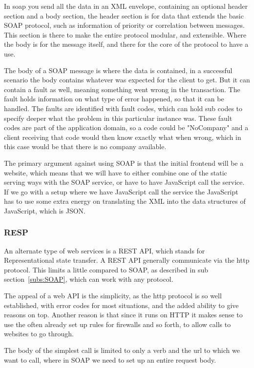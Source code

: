 In soap you send all the data in an XML envelope, containing an optional header section and a body section, the header section is for data that extends the basic SOAP protocol, such as information of priority or correlation between messages\cite{soap:messaging}. This section is there to make the entire protocol modular, and extensible. Where the body is for the message itself, and there for the core of the protocol to have a use.

The body of a SOAP message is where the data is contained, in a successful scenario the body contains whatever was expected for the client to get. But it can contain a fault as well, meaning something went wrong in the transaction. The fault holds information on what type of error happened, so that it can be handled. The faults are identified with fault codes, which can hold sub codes to specify deeper what the problem in this particular instance was. These fault codes are part of the application domain, so a code could be "NoCompany" and a client receiving that code would then know exactly what when wrong, which in this case would be that there is no company available.

The primary argument against using SOAP is that the initial frontend will be a website, which means that we will have to either combine one of the static serving ways with the SOAP service, or have to have JavaScript call the service. If we go with a setup where we have JavaScript call the service the JavaScript has to use some extra energy on translating the XML into the data structures of JavaScript, which is JSON.

\subsubsection{RESP}
\label{subs:RESP}
An alternate type of web services is a REST API, which stands for Representational state transfer. A REST API generally communicate via the http protocol. This limits a little compared to SOAP, as described in sub section~\ref{subs:SOAP}, which can work with any protocol.

The appeal of a web API is the simplicity, as the http protocol is so well established, with error codes for most situations, and the added ability to give reasons on top. Another reason is that since it runs on HTTP it makes sense to use the often already set up rules for firewalls and so forth, to allow calls to websites to go through.

The body of the simplest call is limited to only a verb and the url to which we want to call, where in SOAP we need to set up an entire request body.

